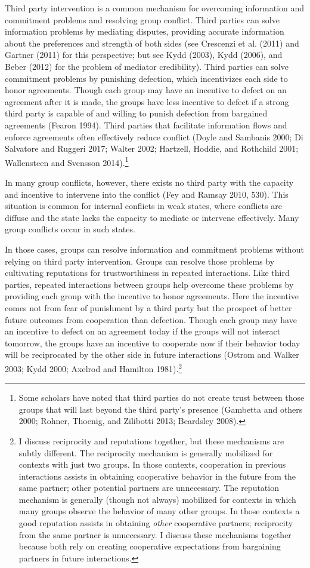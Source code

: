 \documentclass[11pt]{article}
\begin{document}
Third party intervention is a common mechanism for overcoming
information and commitment problems and resolving group conflict. Third
parties can solve information problems by mediating disputes, providing
accurate information about the preferences and strength of both sides
(see Crescenzi et al. (2011) and Gartner (2011) for this perspective;
but see Kydd (2003), Kydd (2006), and Beber (2012) for the problem of
mediator credibility). Third parties can solve commitment problems by
punishing defection, which incentivizes each side to honor agreements.
Though each group may have an incentive to defect on an agreement after
it is made, the groups have less incentive to defect if a strong third
party is capable of and willing to punish defection from bargained
agreements (Fearon 1994). Third parties that facilitate information
flows and enforce agreements often effectively reduce conflict (Doyle
and Sambanis 2000; Di Salvatore and Ruggeri 2017; Walter 2002; Hartzell,
Hoddie, and Rothchild 2001; Wallensteen and Svensson 2014).\footnote{Some
  scholars have noted that third parties do not create trust between
  those groups that will last beyond the third party's presence
  (Gambetta and others 2000; Rohner, Thoenig, and Zilibotti 2013;
  Beardsley 2008).}

In many group conflicts, however, there exists no third party with the
capacity and incentive to intervene into the conflict (Fey and Ramsay
2010, 530). This situation is common for internal conflicts in weak
states, where conflicts are diffuse and the state lacks the capacity to
mediate or intervene effectively. Many group conflicts occur in such
states.

In those cases, groups can resolve information and commitment problems
without relying on third party intervention. Groups can resolve those
problems by cultivating reputations for trustworthiness in repeated
interactions. Like third parties, repeated interactions between groups
help overcome these problems by providing each group with the incentive
to honor agreements. Here the incentive comes not from fear of
punishment by a third party but the prospect of better future outcomes
from cooperation than defection. Though each group may have an incentive
to defect on an agreement today if the groups will not interact
tomorrow, the groups have an incentive to cooperate now if their
behavior today will be reciprocated by the other side in future
interactions (Ostrom and Walker 2003; Kydd 2000; Axelrod and Hamilton
1981).\footnote{I discuss reciprocity and reputations together, but
  these mechanisms are subtly different. The reciprocity mechanism is
  generally mobilized for contexts with just two groups. In those
  contexts, cooperation in previous interactions assists in obtaining
  cooperative behavior in the future from the same partner; other
  potential partners are unnecessary. The reputation mechanism is
  generally (though not always) mobilized for contexts in which many
  groups observe the behavior of many other groups. In those contexts a
  good reputation assists in obtaining \emph{other} cooperative
  partners; reciprocity from the same partner is unnecessary. I discuss
  these mechanisms together because both rely on creating cooperative
  expectations from bargaining partners in future interactions.}
\end{document}
